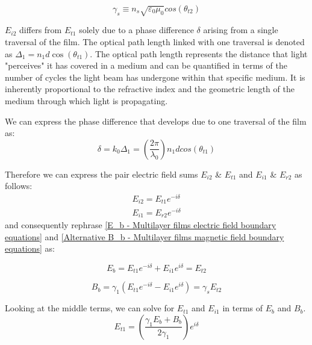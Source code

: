    \begin{equation} \label{gamma s}
        \gamma_s \equiv n_s \sqrt{\varepsilon_0\mu_0} cos(\theta_{t2})
    \end{equation}

$E_{i2}$ differs from $E_{t1}$ solely due to a phase difference $\delta$ arising from a single traversal of the film. The optical path length linked with one traversal is denoted as $\Delta_1=n_1d\cos(\theta_{t1})$. The optical path length represents the distance that light "perceives" it has covered in a medium and can be quantified in terms of the number of cycles the light beam has undergone within that specific medium. It is inherently proportional to the refractive index and the geometric length of the medium through which light is propagating. %

We can express the phase difference that develops due to one traversal of the film as:
    \begin{equation} \label{phase difference}
    \delta = k_0\Delta_1 = \left(\frac{2\pi}{\lambda_0}\right) n_1dcos(\theta_{t1})
    \end{equation}

Therefore we can express the pair electric field sums $E_{i2}$ \& $E_{t1}$ and $E_{i1}$ \& $E_{r2}$ as follows:
    \begin{align*}
        E_{i2} = E_{t1}e^{-i\delta} \\
        E_{i1} = E_{r2}e^{-i\delta}
    \end{align*}
and consequently rephrase \ref{E_b - Multilayer films electric field boundary equations} and \ref{Alternative B_b - Multilayer films magnetic field boundary equations} as:

    \begin{equation} \label{E_b form after phase difference}
    E_b = E_{t1}e^{-i\delta} + E_{i1}e^{i\delta} = E_{t2}
    \end{equation}
    
    \begin{equation} \label{B_b form after phase difference}
    B_b = \gamma_1(E_{t1}e^{-i\delta} - E_{i1}e^{i\delta}) = \gamma_sE_{t2}
    \end{equation}

Looking at the middle terms, we can solve for $E_{t1}$ and $E_{i1}$ in terms of $E_b$ and $B_b$.
    \begin{equation} \label{E_t1}
    E_{t1} = \left(\frac{\gamma_1E_b + B_b}{2\gamma_1}\right)e^{i\delta}
    \end{equation}
    
